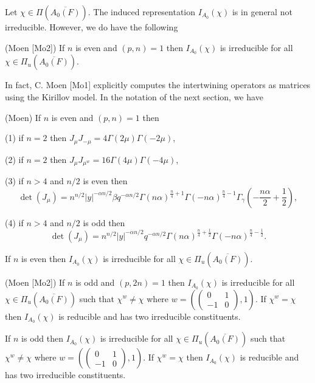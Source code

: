 Let $\chi \in \Pi (\overline{A_0(F)})$. The induced representation $%
I_{A_0}(\chi )$ is in general not irreducible. However, we do have the
following

\begin{theorem}
(Moen [Mo2]) If $n$ is even and $(p,n)=1$ then $I_{A_0}(\chi )$ is
irreducible for all $\chi \in \Pi _u(\overline{A_0(F)})$.
\end{theorem}

In fact, C. Moen [Mo1] explicitly computes the intertwining operators as
matrices using the Kirillov model. In the notation of the next section, we
have

\begin{proposition}
(Moen) If $n$ is even and $(p,n)=1$ then

(1) if $n=2$ then $J_\mu J_{-\mu }=4\Gamma (2\mu )\Gamma (-2\mu )$,

(2) if $n=2$ then $J_\mu J_{\mu ^w}=16\Gamma (4\mu )\Gamma (-4\mu )$,

(3) if $n>4$ and $n/2$ is even then 
\[
\det (J_\mu )=n^{n/2}|y|^{-\alpha n/2}\beta q^{-\alpha n/2}\Gamma (n\alpha
)^{\frac n4+1}\Gamma (-n\alpha )^{\frac n4-1}\Gamma _\gamma (-\frac{n\alpha }%
2+\frac 12),
\]

(4) if $n>4$ and $n/2$ is odd then 
\[
\det (J_\mu )=n^{n/2}|y|^{-\alpha n/2}q^{-\alpha n/2}\Gamma (n\alpha
)^{\frac n4+\frac 12}\Gamma (-n\alpha )^{\frac n4-\frac 12}.
\]
\end{proposition}

\begin{conjecture}
  If $n$ is even then $I_{A_0}(\chi )$ is irreducible for all
  $\chi \in \Pi _u(\overline{A_0(F)})$.
\end{conjecture}

\begin{theorem}
(Moen [Mo2]) If $n$ is odd and $(p,2n)=1$ then $I_{A_0}(\chi )$ is
irreducible for all $\chi \in \Pi _u(\overline{A_0(F)})$ such that $\chi
^w\neq \chi $ where $w=(\left( 
\begin{array}{cc}
0 & 1 \\ 
-1 & 0
\end{array}
\right) ,1)$. If $\chi ^w=\chi $ then $I_{A_0}(\chi )$ is reducible and has
two irreducible constituents.
\end{theorem}

\begin{conjecture}
  If $n$ is odd then $I_{A_0}(\chi )$ is irreducible for all
  $\chi \in \Pi _u(\overline{A_0(F)})$
  such that $\chi ^w\neq \chi $ where $w=(\left( 
\begin{array}{cc}
0 & 1 \\ 
-1 & 0
\end{array}
\right) ,1)$. If $\chi ^w=\chi $ then $I_{A_0}(\chi )$ is reducible and has
two irreducible constituents.
\end{conjecture}

